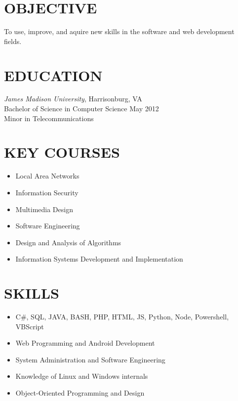 \documentclass[line, margin]{res}
\begin{document}
\address{1604 Swinton Ln \\ Henrico, VA 23238 \\ (804) 543-0554 \\ michael@harpelife.com}
 
\begin{resume}

\section{OBJECTIVE}
To use, improve, and aquire new skills in the software and web development fields.

\section{EDUCATION} 
 \textit {James Madison University}, Harrisonburg, VA \\
 Bachelor of Science in Computer Science \hfill May 2012\\
 Minor in Telecommunications \\

\section{KEY COURSES}

\begin{itemize}[itemsep=2pt,leftmargin=10pt]
\item Local Area Networks 
\item Information Security 
\item Multimedia Design
\item Software Engineering
\item Design and Analysis of Algorithms
\item  Information Systems Development and Implementation
\end{itemize}


\section{SKILLS}
\begin{itemize}[leftmargin=10pt]
\item C\#, SQL, JAVA, BASH, PHP, HTML, JS, Python, Node, Powershell, VBScript
\item Web Programming and Android Development
\item System Administration and Software Engineering
\item Knowledge of Linux and Windows internals
\item Object-Oriented Programming and Design
\end{itemize}


\end{resume}
\end{document}
